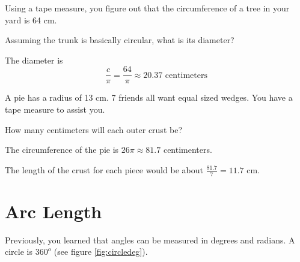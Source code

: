 \begin{Exercise}[title={Circumference}, label=circumference]

  Using a tape measure, you figure out that the circumference of a tree in your
  yard is 64 cm.

  Assuming the trunk is basically circular,  what is its diameter?
  
\end{Exercise}
\begin{Answer}[ref=circumference]

  The diameter is $$\frac{c}{\pi} = \frac{64}{\pi} \approx 20.37 \text{ 
  centimeters}$$
  
\end{Answer}
\begin{Exercise}[title={Splitting a Pie}, label=pie_splitting]

  A pie has a radius of 13 cm.  7 friends all want equal sized wedges.  You 
  have a tape measure to assist you.

  How many centimeters will each outer crust be?

\end{Exercise}
\begin{Answer}[ref=pie_splitting]

  The circumference of the pie is $26 \pi \approx 81.7$ centimenters.
  
  The length of the crust for each piece would be about $\frac{81.7}{7} = 11.7$
  cm.

  
\end{Answer}

\section{Arc Length}
Previously, you learned that angles can be measured in degrees and radians. A 
circle is $360^o$ (see figure \ref{fig:circledeg}). 

